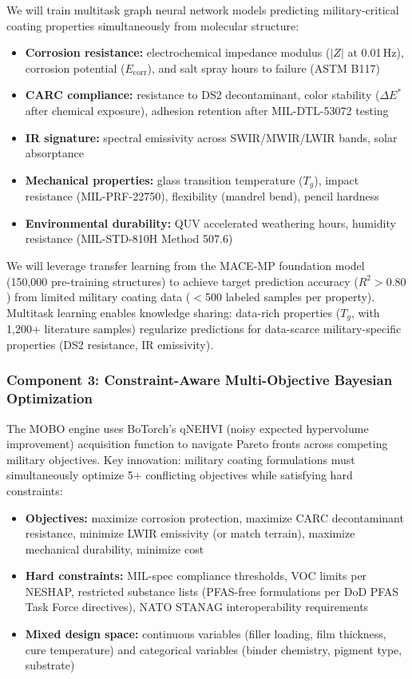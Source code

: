 \documentclass[11pt,letterpaper]{article}
\begin{document}
We will train multitask graph neural network models predicting military-critical coating properties simultaneously from molecular structure:

\begin{itemize}[nosep]
  \item \textbf{Corrosion resistance:} electrochemical impedance modulus ($|Z|$ at 0.01\,Hz), corrosion potential ($E_\mathrm{corr}$), and salt spray hours to failure (ASTM B117)
  \item \textbf{CARC compliance:} resistance to DS2 decontaminant, color stability ($\Delta E^*$ after chemical exposure), adhesion retention after MIL-DTL-53072 testing
  \item \textbf{IR signature:} spectral emissivity across SWIR/MWIR/LWIR bands, solar absorptance
  \item \textbf{Mechanical properties:} glass transition temperature ($T_g$), impact resistance (MIL-PRF-22750), flexibility (mandrel bend), pencil hardness
  \item \textbf{Environmental durability:} QUV accelerated weathering hours, humidity resistance (MIL-STD-810H Method 507.6)
\end{itemize}

We will leverage transfer learning from the MACE-MP foundation model (150,000 pre-training structures) to achieve target prediction accuracy ($R^2 > 0.80$) from limited military coating data ($<$500 labeled samples per property). Multitask learning enables knowledge sharing: data-rich properties ($T_g$, with 1,200+ literature samples) regularize predictions for data-scarce military-specific properties (DS2 resistance, IR emissivity).

\subsubsection{Component 3: Constraint-Aware Multi-Objective Bayesian Optimization}

The MOBO engine uses BoTorch's qNEHVI (noisy expected hypervolume improvement) acquisition function to navigate Pareto fronts across competing military objectives. Key innovation: military coating formulations must simultaneously optimize 5+ conflicting objectives while satisfying hard constraints:

\begin{itemize}[nosep]
  \item \textbf{Objectives:} maximize corrosion protection, maximize CARC decontaminant resistance, minimize LWIR emissivity (or match terrain), maximize mechanical durability, minimize cost
  \item \textbf{Hard constraints:} MIL-spec compliance thresholds, VOC limits per NESHAP, restricted substance lists (PFAS-free formulations per DoD PFAS Task Force directives), NATO STANAG interoperability requirements
  \item \textbf{Mixed design space:} continuous variables (filler loading, film thickness, cure temperature) and categorical variables (binder chemistry, pigment type, substrate)
\end{itemize}
\end{document}
